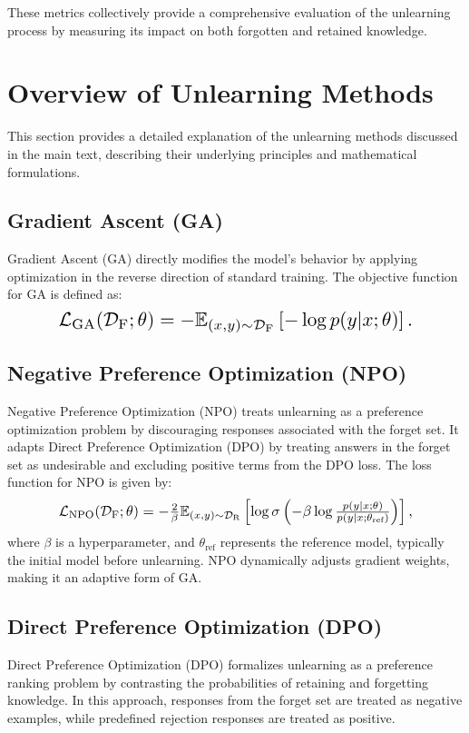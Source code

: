 These metrics collectively provide a comprehensive evaluation of the unlearning process by measuring its impact on both forgotten and retained knowledge.
\section{Overview of Unlearning Methods}
\label{appendix:overviewUnlearningMethods}
This section provides a detailed explanation of the unlearning methods discussed in the main text, describing their underlying principles and mathematical formulations.

\subsection{Gradient Ascent (GA)}
Gradient Ascent (GA) directly modifies the model’s behavior by applying optimization in the reverse direction of standard training. The objective function for GA is defined as:
\begin{equation}\label{eq:GA}
\resizebox{0.81\hsize}{!}{$
\mathcal{L}_{\text{GA}}(\mathcal{D}_{\text{F}};\theta) 
= - \mathbb{E}_{(x,y) \sim \mathcal{D}_{\text{F}}} \left[ -\log p(y|x; \theta) \right]. 
$}
\end{equation}
\subsection{Negative Preference Optimization (NPO)}
Negative Preference Optimization (NPO) treats unlearning as a preference optimization problem by discouraging responses associated with the forget set. It adapts Direct Preference Optimization (DPO) by treating answers in the forget set as undesirable and excluding positive terms from the DPO loss. The loss function for NPO is given by:
\begin{equation}\label{eq:NPO}
\resizebox{0.81\hsize}{!}{$
\mathcal{L}_{\text{NPO}}(\mathcal{D}_{\text{F}};\theta) 
= -\frac{2}{\beta} \mathbb{E}_{(x,y)\sim \mathcal{D}_{\text{R}}} \left[ \log \sigma \left(-\beta \log \frac{p(y|x;\theta)}{p(y|x;\theta_{\text{ref}})} \right) \right],
$}
\end{equation}
where $\beta$ is a hyperparameter, and $\theta_{\text{ref}}$ represents the reference model, typically the initial model before unlearning. NPO dynamically adjusts gradient weights, making it an adaptive form of GA.

\subsection{Direct Preference Optimization (DPO)}
Direct Preference Optimization (DPO) formalizes unlearning as a preference ranking problem by contrasting the probabilities of retaining and forgetting knowledge. In this approach, responses from the forget set are treated as negative examples, while predefined rejection responses are treated as positive.

